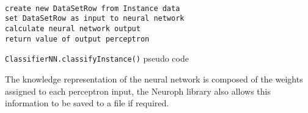 \documentclass[a4paper]{article}
\begin{document}
\begin{listing}[H]
  \begin{verbatim}

create new DataSetRow from Instance data
set DataSetRow as input to neural network
calculate neural network output
return value of output perceptron

  \end{verbatim}
  \caption{\texttt{ClassifierNN.classifyInstance()} pseudo code}
  \label{list:ClassifierNN_classifyInstance}
\end{listing}

The knowledge representation of the neural network is composed of the weights
assigned to each perceptron input, the Neuroph library also allows this
information to be saved to a file if required.

\printbibliography
\end{document}
